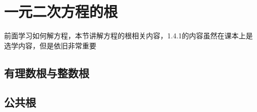 \section{一元二次方程的根}

前面学习如何解方程，本节讲解方程的根相关内容，1.4.1的内容虽然在课本上是选学内容，但是依旧非常重要



\subsection{有理数根与整数根}

\subsection{公共根}